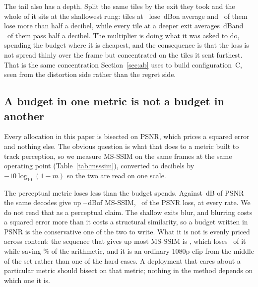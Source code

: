 \documentclass[10pt,twocolumn,letterpaper]{article}
\newcommand{\dB}{\,dB}
\begin{document}
The tail also has a depth. Split the same tiles by the exit they took and the
whole of it sits at the shallowest rung: tiles at \TailExitLo\ lose
\TailExitLoMean\dB on average and \TailExitLoOver\ of them lose more than half
a decibel, while every tile at a deeper exit averages \TailExitRestMean\dB and
\TailExitRestOver\ of them pass half a decibel. The multiplier is doing what it
was asked to do, spending the budget where it is cheapest, and the consequence is
that the loss is not spread thinly over the frame but concentrated on the tiles
it sent furthest. That is the same concentration Section~\ref{sec:ab} uses to
build configuration~C, seen from the distortion side rather than the regret
side.

\subsection{A budget in one metric is not a budget in another}

Every allocation in this paper is bisected on PSNR, which prices a squared error
and nothing else. The obvious question is what that does to a metric built to
track perception, so we measure MS-SSIM on the same frames at the same operating
point (Table~\ref{tab:msssim}), converted to decibels by $-10\log_{10}(1-m)$ so
the two are read on one scale.

\begin{table}[t]
\centering

\caption{\textbf{Two metrics at one operating point.} The $0.1\dB$ budget,
\NumSeq\ sequences, configuration~A. MS-SSIM is converted to decibels by
$-10\log_{10}(1-m)$. Both columns are what the routed decode gives up against
the released decoder on the same latent.}
\label{tab:msssim}
\end{table}

The perceptual metric loses less than the budget spends. Against \MsPsnrLoss\dB
of PSNR the same decodes give up \MsSsimLossLo--\MsSsimLossHi\dB of MS-SSIM,
\MsSsimRatio\ of the PSNR loss, at every rate. We do not read that as a
perceptual claim. The shallow exits blur, and blurring costs a squared error more
than it costs a structural similarity, so a budget written in PSNR is the
conservative one of the two to write. What it is not is evenly priced across
content: the sequence that gives up most MS-SSIM is \MsWorstSeq, which loses
\MsWorstDb\ of it while saving \MsWorstSaving\% of the arithmetic, and it is
an ordinary 1080p clip from the middle of the set rather than one of the hard
cases. A deployment that cares about a particular metric should bisect on that
metric; nothing in the method depends on which one it is.
\end{document}
